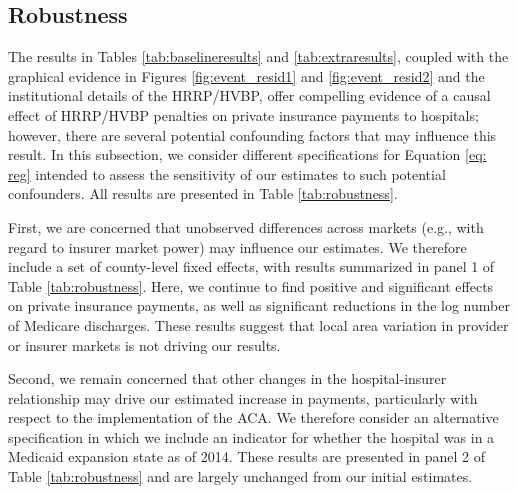\documentclass[12pt]{article}
\begin{document}
\subsection{Robustness}
\label{sec:robust}
The results in Tables \ref{tab:baselineresults} and \ref{tab:extraresults}, coupled with the graphical evidence in Figures \ref{fig:event_resid1} and \ref{fig:event_resid2} and the institutional details of the HRRP/HVBP, offer compelling evidence of a causal effect of HRRP/HVBP penalties on private insurance payments to hospitals; however, there are several potential confounding factors that may influence this result. In this subsection, we consider different specifications for Equation \ref{eq: reg} intended to assess the sensitivity of our estimates to such potential confounders. All results are presented in Table \ref{tab:robustness}.

First, we are concerned that unobserved differences across markets (e.g., with regard to insurer market power) may influence our estimates. We therefore include a set of county-level fixed effects, with results summarized in panel 1 of Table \ref{tab:robustness}. Here, we continue to find positive and significant effects on private insurance payments, as well as significant reductions in the log number of Medicare discharges. These results suggest that local area variation in provider or insurer markets is not driving our results.

Second, we remain concerned that other changes in the hospital-insurer relationship may drive our estimated increase in payments, particularly with respect to the implementation of the ACA. We therefore consider an alternative specification in which we include an indicator for whether the hospital was in a Medicaid expansion state as of 2014. These results are presented in panel 2 of Table \ref{tab:robustness} and are largely unchanged from our initial estimates.
\end{document}
